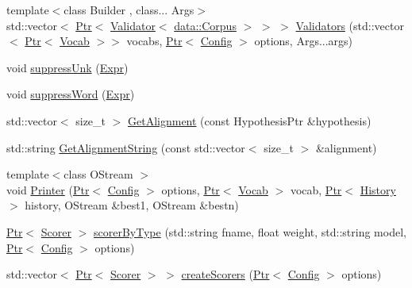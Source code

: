 \begin{DoxyCompactItemize}
\item 
{\footnotesize template$<$class Builder , class... Args$>$ }\\std\+::vector$<$ \hyperlink{namespacemarian_ad1a373be43a00ef9ce35666145137b08}{Ptr}$<$ \hyperlink{classmarian_1_1Validator}{Validator}$<$ \hyperlink{classmarian_1_1data_1_1Corpus}{data\+::\+Corpus} $>$ $>$ $>$ \hyperlink{namespacemarian_a691f0c637b8713ff7972cdd276f2e099}{Validators} (std\+::vector$<$ \hyperlink{namespacemarian_ad1a373be43a00ef9ce35666145137b08}{Ptr}$<$ \hyperlink{classmarian_1_1Vocab}{Vocab} $>$$>$ vocabs, \hyperlink{namespacemarian_ad1a373be43a00ef9ce35666145137b08}{Ptr}$<$ \hyperlink{classmarian_1_1Config}{Config} $>$ options, Args...\+args)
\item 
void \hyperlink{namespacemarian_a1a6a78f80709472d63948acfbce75000}{suppress\+Unk} (\hyperlink{namespacemarian_a498d8baf75b754011078b890b39c8e12}{Expr})
\item 
void \hyperlink{namespacemarian_a20fd4638030b78bfd5e965a5e6344fa5}{suppress\+Word} (\hyperlink{namespacemarian_a498d8baf75b754011078b890b39c8e12}{Expr})
\item 
std\+::vector$<$ size\+\_\+t $>$ \hyperlink{namespacemarian_a49a499e87a63f466833f0e3a4226ac7d}{Get\+Alignment} (const Hypothesis\+Ptr \&hypothesis)
\item 
std\+::string \hyperlink{namespacemarian_a9ddf4c02d2ea11d99b10769ecfa42488}{Get\+Alignment\+String} (const std\+::vector$<$ size\+\_\+t $>$ \&alignment)
\item 
{\footnotesize template$<$class O\+Stream $>$ }\\void \hyperlink{namespacemarian_a3a6ae585e5e6554beee2ab09a6433e83}{Printer} (\hyperlink{namespacemarian_ad1a373be43a00ef9ce35666145137b08}{Ptr}$<$ \hyperlink{classmarian_1_1Config}{Config} $>$ options, \hyperlink{namespacemarian_ad1a373be43a00ef9ce35666145137b08}{Ptr}$<$ \hyperlink{classmarian_1_1Vocab}{Vocab} $>$ vocab, \hyperlink{namespacemarian_ad1a373be43a00ef9ce35666145137b08}{Ptr}$<$ \hyperlink{classmarian_1_1History}{History} $>$ history, O\+Stream \&best1, O\+Stream \&bestn)
\item 
\hyperlink{namespacemarian_ad1a373be43a00ef9ce35666145137b08}{Ptr}$<$ \hyperlink{classmarian_1_1Scorer}{Scorer} $>$ \hyperlink{namespacemarian_a1ed6060be1629d300bbdad6f12991106}{scorer\+By\+Type} (std\+::string fname, float weight, std\+::string model, \hyperlink{namespacemarian_ad1a373be43a00ef9ce35666145137b08}{Ptr}$<$ \hyperlink{classmarian_1_1Config}{Config} $>$ options)
\item 
std\+::vector$<$ \hyperlink{namespacemarian_ad1a373be43a00ef9ce35666145137b08}{Ptr}$<$ \hyperlink{classmarian_1_1Scorer}{Scorer} $>$ $>$ \hyperlink{namespacemarian_aa68a12c768f24cc7d06314eadfab8938}{create\+Scorers} (\hyperlink{namespacemarian_ad1a373be43a00ef9ce35666145137b08}{Ptr}$<$ \hyperlink{classmarian_1_1Config}{Config} $>$ options)
\end{DoxyCompactItemize}

